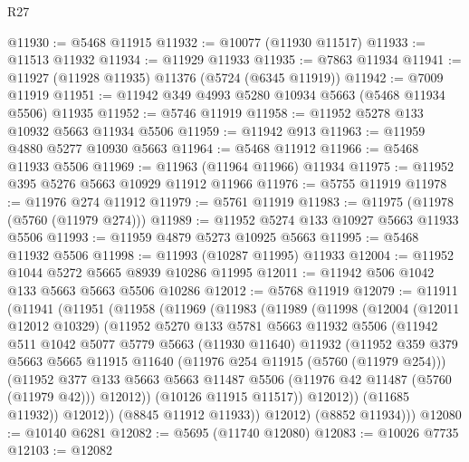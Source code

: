 \begin{lexlean}{R27}
\begin{coremodule}
@11930 := @5468 @11915
@11932 := @10077 (@11930 @11517)
@11933 := @11513 @11932
@11934 := @11929 @11933
@11935 := @7863 @11934
@11941 := @11927 (@11928 @11935) @11376 (@5724 (@6345 @11919))
@11942 := @7009 @11919
@11951 := @11942 @349 @4993 @5280 @10934 @5663 (@5468 @11934 @5506) @11935
@11952 := @5746 @11919
@11958 := @11952 @5278 @133 @10932 @5663 @11934 @5506
@11959 := @11942 @913
@11963 := @11959 @4880 @5277 @10930 @5663
@11964 := @5468 @11912
@11966 := @5468 @11933 @5506
@11969 := @11963 (@11964 @11966) @11934
@11975 := @11952 @395 @5276 @5663 @10929 @11912 @11966
@11976 := @5755 @11919
@11978 := @11976 @274 @11912
@11979 := @5761 @11919
@11983 := @11975 (@11978 (@5760 (@11979 @274)))
@11989 := @11952 @5274 @133 @10927 @5663 @11933 @5506
@11993 := @11959 @4879 @5273 @10925 @5663
@11995 := @5468 @11932 @5506
@11998 := @11993 (@10287 @11995) @11933
@12004 := @11952 @1044 @5272 @5665 @8939 @10286 @11995
@12011 := @11942 @506 @1042 @133 @5663 @5663 @5506 @10286
@12012 := @5768 @11919
@12079 := @11911
    (@11941
      (@11951
        (@11958
          (@11969
            (@11983
              (@11989
                (@11998
                  (@12004
                    (@12011 @12012 @10329)
                    (@11952
                      @5270
                      @133
                      @5781
                      @5663
                      @11932
                      @5506
                      (@11942
                        @511
                        @1042
                        @5077
                        @5779
                        @5663
                        (@11930 @11640)
                        @11932
                        (@11952
                          @359
                          @379
                          @5663
                          @5665
                          @11915
                          @11640
                          (@11976 @254 @11915 (@5760 (@11979 @254)))
                          (@11952
                            @377
                            @133
                            @5663
                            @5663
                            @11487
                            @5506
                            (@11976 @42 @11487 (@5760 (@11979 @42)))
                            @12012))
                        (@10126 @11915 @11517))
                      @12012))
                  (@11685 @11932))
                @12012))
            (@8845 @11912 @11933))
          @12012)
        (@8852 @11934)))
@12080 := @10140 @6281
@12082 := @5695 (@11740 @12080)
@12083 := @10026 @7735
@12103 := @12082

\end{coremodule}
\end{lexlean}
